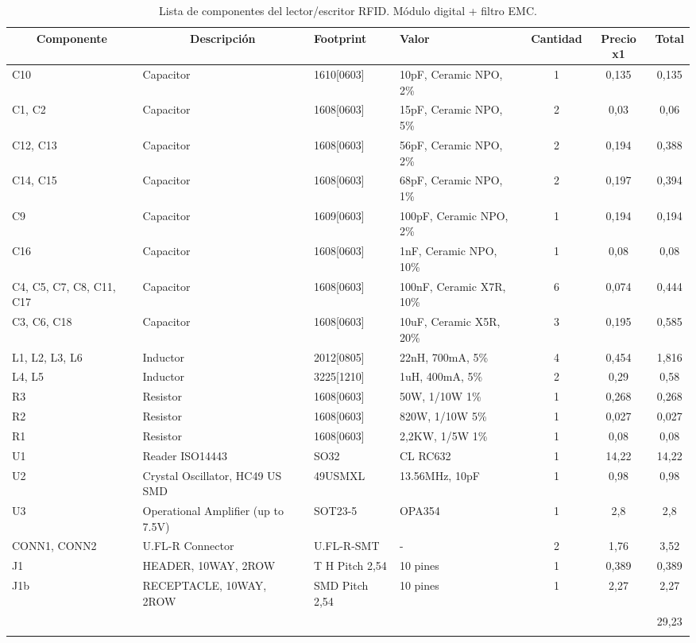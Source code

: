 \begin{longtable}{|p{1cm}|p{2.5cm}|p{2cm}|p{2.5cm}|c|c|c|}
\hline
\multicolumn{1}{|c|}{\textbf{Componente}} & \multicolumn{1}{c|}{\textbf{Descripción}} & \textbf{ Footprint} & \textbf{Valor} & \textbf{Cantidad} & \textbf{Precio x1} & \textbf{Total} \\ \hline
C10 & Capacitor & 1610[0603] & 10pF, Ceramic NPO, 2\% & 1 & 0,135 & 0,135 \\ \hline
C1, C2 & Capacitor & 1608[0603] & 15pF, Ceramic NPO, 5\% & 2 & 0,03 & 0,06 \\ \hline
C12, C13 & Capacitor & 1608[0603] & 56pF, Ceramic NPO, 2\% & 2 & 0,194 & 0,388 \\ \hline
C14, C15 & Capacitor & 1608[0603] & 68pF, Ceramic NPO, 1\% & 2 & 0,197 & 0,394 \\ \hline
C9 & Capacitor & 1609[0603] & 100pF, Ceramic NPO,  2\% & 1 & 0,194 & 0,194 \\ \hline
C16 & Capacitor & 1608[0603] & 1nF, Ceramic NPO, 10\% & 1 & 0,08 & 0,08 \\ \hline
C4, C5, C7, C8, C11, C17 & Capacitor & 1608[0603] & 100nF, Ceramic X7R, 10\% & 6 & 0,074 & 0,444 \\ \hline
C3, C6, C18 & Capacitor & 1608[0603] & 10uF, Ceramic X5R, 20\% & 3 & 0,195 & 0,585 \\ \hline
L1, L2, L3, L6 & Inductor & 2012[0805] & 22nH, 700mA, 5\% & 4 & 0,454 & 1,816 \\ \hline
L4, L5 & Inductor & 3225[1210] & 1uH, 400mA, 5\% & 2 & 0,29 & 0,58 \\ \hline
R3 & Resistor & 1608[0603] & 50W, 1/10W   1\% & 1 & 0,268 & 0,268 \\ \hline
R2 & Resistor & 1608[0603] & 820W, 1/10W   5\% & 1 & 0,027 & 0,027 \\ \hline
R1 & Resistor & 1608[0603] & 2,2KW, 1/5W   1\% & 1 & 0,08 & 0,08 \\ \hline
U1 & Reader ISO14443 & SO32 & CL RC632 & 1 & 14,22 & 14,22 \\ \hline
U2 & Crystal Oscillator, HC49 US SMD & 49USMXL & 13.56MHz, 10pF & 1 & 0,98 & 0,98 \\ \hline
U3 & Operational Amplifier (up to 7.5V) & SOT23-5 & OPA354 & 1 & 2,8 & 2,8 \\ \hline
CONN1, CONN2 & U.FL-R Connector & U.FL-R-SMT & - & 2 & 1,76 & 3,52 \\ \hline
J1 & HEADER, 10WAY, 2ROW & T H Pitch 2,54 & 10 pines & 1 & 0,389 & 0,389 \\ \hline
J1b & RECEPTACLE, 10WAY, 2ROW & SMD  Pitch 2,54 & 10 pines & 1 & 2,27 & 2,27 \\ \hline
 &  & \multicolumn{1}{l|}{} & \multicolumn{1}{l|}{} & \multicolumn{1}{l|}{} & \multicolumn{1}{l|}{} & 29,23 \\ \hline
\caption{Lista de componentes del lector/escritor RFID. Módulo digital + filtro EMC.}
\label{}
\end{longtable}

